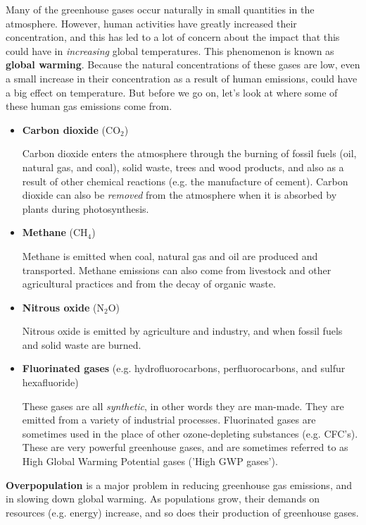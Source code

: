 Many of the greenhouse gases occur naturally in small quantities in the atmosphere. However, human activities have greatly increased their concentration, and this has led to a lot of concern about the impact that this could have in \textit{increasing} global temperatures. This phenomenon is known as \textbf{global warming}. Because the natural concentrations of these gases are low, even a small increase in their concentration as a result of human emissions, could have a big effect on temperature. But before we go on, let's look at where some of these human gas emissions come from.

\begin{itemize}

\item{\textbf{Carbon dioxide} (CO$_{2}$)

Carbon dioxide enters the atmosphere through the burning of fossil fuels (oil, natural gas, and coal), solid waste, trees and wood products, and also as a result of other chemical reactions (e.g. the manufacture of cement). Carbon dioxide can also be \textit{removed} from the atmosphere when it is absorbed by plants during photosynthesis.}

\item{\textbf{Methane} (CH$_{4}$)
 
Methane is emitted when coal, natural gas and oil are produced and transported. Methane emissions can also come from livestock and other agricultural practices and from the decay of organic waste.}

\item{\textbf{Nitrous oxide} (N$_{2}$O)

Nitrous oxide is emitted by agriculture and industry, and when fossil fuels and solid waste are burned.}
 
\item{\textbf{Fluorinated gases} (e.g. hydrofluorocarbons, perfluorocarbons, and sulfur hexafluoride)

These gases are all \textit{synthetic}, in other words they are man-made. They are emitted from a variety of industrial processes. Fluorinated gases are sometimes used in the place of other ozone-depleting substances (e.g. CFC's). These are very powerful greenhouse gases, and are sometimes referred to as High Global Warming Potential gases ('High GWP gases').}
 
\end{itemize}

\textbf{Overpopulation} is a major problem in reducing greenhouse gas emissions, and in slowing down global warming. As populations grow, their demands on resources (e.g. energy) increase, and so does their production of greenhouse gases.\\


